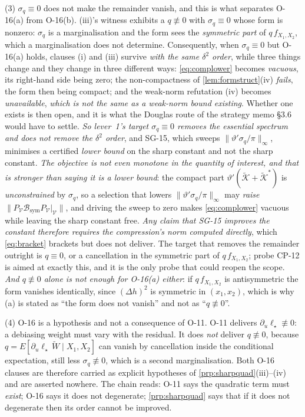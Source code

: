 \begin{remark}
\textup{(3)} $\sigma_q\equiv0$ does not make the remainder vanish, and this is what separates
O-16\textup{(a)} from O-16\textup{(b)}. (iii)'s witness exhibits a $q\not\equiv0$ with
$\sigma_q\equiv0$ whose form is nonzero: $\sigma_q$ is a marginalisation and the form sees the
\emph{symmetric part} of $q\,f_{X_1,X_2}$, which a marginalisation does not determine. Consequently, when
$\sigma_q\equiv0$ but O-16(a) holds, clauses (i) and (iii) survive \emph{with the same $\delta^{2}$
order}, while three things change and they change in three different ways: \eqref{eq:complower} becomes
\emph{vacuous}, its right-hand side being zero; the non-compactness of \cref{lem:formstruct}(iv)
\emph{fails}, the form then being compact; and the weak-norm refutation (iv) becomes
\emph{unavailable}, \emph{which is not the same as a weak-norm bound existing}. Whether one exists is
then open, and it is what the Douglas route of the strategy memo \S3.6 would have to settle.
\emph{So lever~1's target $\sigma_q\equiv0$ removes the essential spectrum and does not remove the
$\delta^{2}$ order}, and SG-15, which sweeps $\|\vartheta'\sigma_q/\pi\|_\infty$, minimises a
certified \emph{lower bound} on the sharp constant and not the sharp constant. \emph{The objective is
not even monotone in the quantity of interest, and that is stronger than saying it is a lower bound}:
the compact part $\vartheta'(\tilde{\mathcal K}+\tilde{\mathcal K}^{\ast})$ is \emph{unconstrained} by
$\sigma_q$, so a selection that lowers $\|\vartheta'\sigma_q/\pi\|_\infty$ may \emph{raise}
$\|P_{\mathcal V}\mathcal B_{\mathrm{sym}}P_{\mathcal V}|_{\mathcal V}\|$, and driving the sweep to zero
makes \eqref{eq:complower} vacuous while leaving the sharp constant free. \emph{Any claim that SG-15
improves the constant therefore requires the compression's norm computed directly}, which
\eqref{eq:bracket} brackets but does not deliver. The target that removes the remainder
outright is $q\equiv0$, or a cancellation in the symmetric part of $q\,f_{X_1,X_2}$; probe CP-12 is aimed
at exactly this, and it is the only probe that could reopen the scope. \emph{And $q\not\equiv0$ alone is
not enough for O-16(a) either}: if $q\,f_{X_1,X_2}$ is antisymmetric the form vanishes identically, since
$(\Delta h)^{2}$ is symmetric in $(x_1,x_2)$, which is why (a) is stated as ``the form does not
vanish'' and not as ``$q\not\equiv0$''.

\textup{(4)} O-16 is a hypothesis and not a consequence of O-11. O-11 delivers
$\partial_u\ell_\star\not\equiv0$: a debiasing weight must vary with the residual. It does \emph{not}
deliver $q\not\equiv0$, because $q=E[\partial_u\ell_\star\,\widetilde W\mid X_1,X_2]$ can vanish by
cancellation inside the conditional expectation, still less $\sigma_q\not\equiv0$, which is a second
marginalisation. Both O-16 clauses are therefore carried as explicit hypotheses of
\cref{prp:sharpquad}\textup{(iii)}--\textup{(iv)} and are asserted nowhere. The chain reads: O-11 says
the quadratic term must \emph{exist}; O-16 says it does not degenerate; \cref{prp:sharpquad} says that if
it does not degenerate then its order cannot be improved.
\end{remark}



